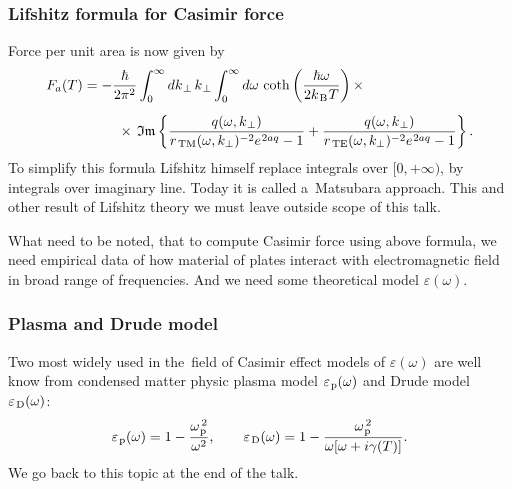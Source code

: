 \documentclass[10pt,t]{beamer}
\begin{document}





\begin{frame}
  \frametitle{Lifshitz formula for Casimir force}


  Force per unit area is now given by
  \begin{equation}
    \label{eq:First-theoretical-works-04}
    \begin{split}
      F_{ a }( T )
      &=
        -\frac{ \hbar }{ 2 \pi^{ 2 } }
        \int_{ 0 }^{ \infty } dk_{ \hspace{0.05em} \bot } \, k_{ \hspace{0.05em} \bot }
        \int_{ 0 }^{ \infty } d \omega \, \coth\left( \frac{ \hbar \omega }{
        2 k_{ \hspace{0.09em} \text{B} } \hspace{0.05em} T } \right) \times \\[0.5em]
      &\hspace{2.5em}
        \times \, \operatorname{\mathfrak{Im}}\left\{ \frac{ q( \omega, k_{ \hspace{0.05em} \bot } ) }{
        r_{ \, \text{TM} }( \omega, k_{ \bot } )^{ -2 } e^{ \hspace{0.05em} 2 a q } - 1 } +
        \frac{ q( \omega, k_{ \hspace{0.05em} \bot } ) }{
        r_{ \, \text{TE} }( \omega, k_{ \bot } )^{ -2 } e^{ \hspace{0.05em} 2 a q } - 1 }
        \right\}.
    \end{split}
  \end{equation}
  To simplify this formula Lifshitz himself replace integrals over
  $[ 0, + \infty )$, by integrals over imaginary line. Today it is called
  a~Matsubara approach. This and other result of Lifshitz theory we must
  leave outside scope of this talk.

  What need to be noted, that to compute Casimir force using above formula,
  we need empirical data of how material of plates interact with
  electromagnetic field in broad range of frequencies. And we need some
  theoretical model $\varepsilon( \omega )$.

\end{frame}





\begin{frame}
  \frametitle{Plasma and Drude model}


  Two most widely used in the~field of Casimir effect models of $\varepsilon( \omega )$
  are well know from condensed matter physic plasma model
  $\varepsilon_{ \hspace{0.07em} \text{p} }( \omega )$ and Drude model
  $\varepsilon_{ \hspace{0.09em} \text{D} }( \omega )$:
  \begin{equation}
    \label{eq:First-theoretical-works-05}
    \varepsilon_{ \hspace{0.07em} \text{p} }( \omega ) =
    1 - \frac{ \omega_{ \hspace{0.07em} \text{p} }^{ \, 2 } }{ \omega^{ 2 } }, \qquad
    \varepsilon_{ \hspace{0.09em} \text{D} }( \omega ) =
    1 - \frac{ \omega_{ \hspace{0.07em} \text{p} }^{ \, 2 } }{ \omega [ \omega + i \gamma( T ) ] }.
  \end{equation}
  We go back to this topic at the end of the talk.

\end{frame}
\end{document}
